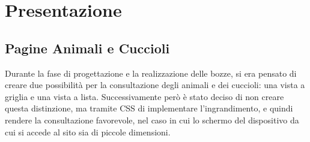 \section{Presentazione}

\subsection{Pagine Animali e Cuccioli}
Durante la fase di progettazione e la realizzazione delle bozze, si era pensato di creare due possibilità per la consultazione degli animali e dei cuccioli: una vista a griglia e una vista a lista. Successivamente però è stato deciso di non creare questa distinzione, ma tramite CSS di implementare l'ingrandimento, e quindi rendere la consultazione favorevole, nel caso in cui lo schermo del dispositivo da cui si accede al sito sia di piccole dimensioni.
\pagebreak